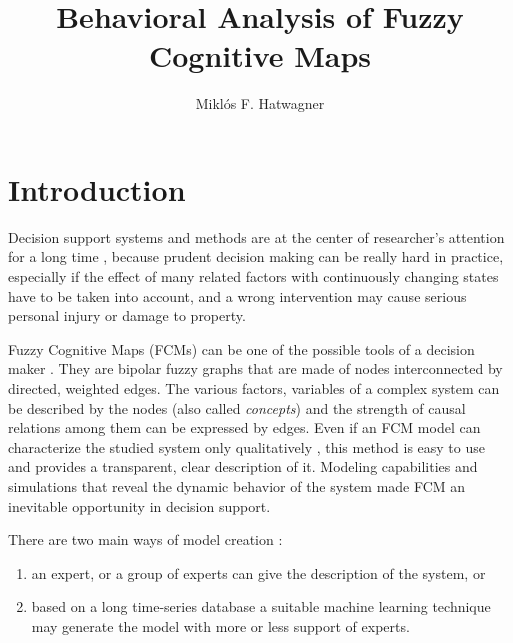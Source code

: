 \documentclass[graybox]{svmult}
\begin{document}
\title*{Behavioral Analysis of Fuzzy Cognitive Maps}
\author{Miklós F. Hatwagner}
%
%
\maketitle



\section{Introduction}
\label{sec:intro}

Decision support systems and methods are at the center of 
researcher's attention for a long time \cite{busemeyer1999dynamic}, 
because prudent decision making can be really hard in practice, 
especially if the effect of many related factors with continuously 
changing states have to be taken into account, and a wrong 
intervention may cause serious personal injury or damage to property.

Fuzzy Cognitive Maps (FCMs) \cite{b.kosko1986} can be one of the 
possible tools of a decision maker \cite{papageorgiou2013fuzzy}. 
They are bipolar fuzzy graphs that are made of nodes interconnected 
by directed, weighted edges. The various factors, variables of a 
complex system can be described by the nodes (also called \emph
{concepts}) and the strength of causal relations among them can be 
expressed by edges. Even if an FCM model can characterize the 
studied system only qualitatively \cite{j.l.salmeron2009}, this 
method is easy to use and provides a transparent, clear description 
of it. Modeling capabilities and simulations that reveal the dynamic 
behavior of the system made FCM an inevitable opportunity in 
decision support.

There are two main ways of model creation \cite{papageorgiou2012learning}:
\begin{enumerate}
  \item an expert, or a group of experts can give the description of 
  the system, or
  \item based on a long time-series database a suitable machine 
  learning technique may generate the model with more or less support 
  of experts.
\end{enumerate}
\end{document}
